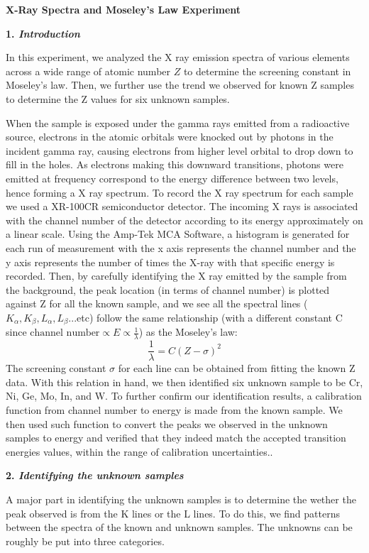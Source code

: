 \documentclass[12pt]{article}
\begin{document}
\textbf{X-Ray Spectra and Moseley’s Law Experiment}
\bigskip

\textbf{1. \textit{Introduction}}
\smallskip

In this experiment, we analyzed the X ray emission spectra of various elements across a wide range of atomic number $Z$ to determine the screening constant in Moseley's law. Then, we further use the trend we observed for known Z samples to determine the Z values for six unknown samples.

When the sample is exposed under the gamma rays emitted from a radioactive source, electrons in the atomic orbitals were knocked out by photons in the incident gamma ray, causing electrons from higher level orbital to drop down to fill in the holes. As electrons making this downward transitions, photons were emitted at frequency correspond to the energy difference between two levels, hence forming a X ray spectrum. To record the X ray spectrum for each sample we used a XR-100CR semiconductor detector. The incoming X rays is associated with the channel number of the detector according to its energy approximately on a linear scale. Using the Amp-Tek MCA Software, a histogram is generated for each run of measurement with the x axis represents the channel number and the y axis represents the number of times the X-ray with that specific energy is recorded. Then, by carefully identifying the X ray emitted by the sample from the background, the peak location (in terms of channel number) is plotted against Z for all the known sample, and we see all the spectral lines ($K_{\alpha}, K_{\beta}, L_{\alpha}, L_{\beta}$...etc) follow the same relationship (with a different constant C since $\text{channel number} \propto E \propto \frac{1}{\lambda}$) as the Moseley's law:
$$\frac{1}{\lambda} = C(Z- \sigma)^2$$
The screening constant $\sigma$ for each line can be obtained from fitting the known Z data. With this relation in hand, we then identified six unknown sample to be Cr, Ni, Ge, Mo, In, and W. To further confirm our identification results, a calibration function from channel number to energy is made from the known sample. We then used such function to convert the peaks we observed in the unknown samples to energy and verified that they indeed match the accepted transition energies values, within the range of calibration uncertainties..
\bigskip

\textbf{2. \textit{Identifying the unknown samples}}
\smallskip

A major part in identifying the unknown samples is to determine the wether the peak observed is from the K lines or the L lines. To do this, we find patterns between the spectra of the known and unknown samples. The unknowns can be roughly be put into three categories. 
\end{document}

